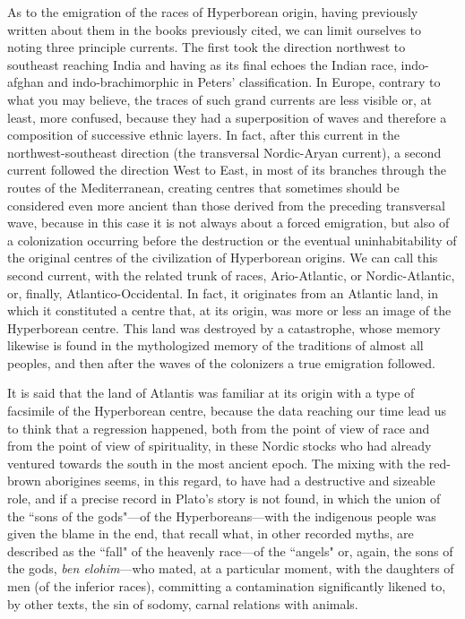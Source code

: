 As to the emigration of the races of Hyperborean origin, having previously written about them in the books previously cited, we can limit ourselves to noting three principle currents. The first took the direction northwest to southeast reaching India and having as its final echoes the Indian race, indo-afghan and indo-brachimorphic in Peters' classification. In Europe, contrary to what you may believe, the traces of such grand currents are less visible or, at least, more confused, because they had a superposition of waves and therefore a composition of successive ethnic layers. In fact, after this current in the northwest-southeast direction (the transversal Nordic-Aryan current), a second current followed the direction West to East, in most of its branches through the routes of the Mediterranean, creating centres that sometimes should be considered even more ancient than those derived from the preceding transversal wave, because in this case it is not always about a forced emigration, but also of a colonization occurring before the destruction or the eventual uninhabitability of the original centres of the civilization of Hyperborean origins. We can call this second current, with the related trunk of races, Ario-Atlantic, or Nordic-Atlantic, or, finally, Atlantico-Occidental. In fact, it originates from an Atlantic land, in which it constituted a centre that, at its origin, was more or less an image of the Hyperborean centre. This land was destroyed by a catastrophe, whose memory likewise is found in the mythologized memory of the traditions of almost all peoples, and then after the waves of the colonizers a true emigration followed.

It is said that the land of Atlantis was familiar at its origin with a type of facsimile of the Hyperborean centre, because the data reaching our time lead us to think that a regression happened, both from the point of view of race and from the point of view of spirituality, in these Nordic stocks who had already ventured towards the south in the most ancient epoch. The mixing with the red-brown aborigines seems, in this regard, to have had a destructive and sizeable role, and if a precise record in Plato's story is not found, in which the union of the ``sons of the gods"—of the Hyperboreans—with the indigenous people was given the blame in the end, that recall what, in other recorded myths, are described as the ``fall" of the heavenly race—of the ``angels" or, again, the sons of the gods, \emph{ben elohim}—who mated, at a particular moment, with the daughters of men (of the inferior races), committing a contamination significantly likened to, by other texts, the sin of sodomy, carnal relations with animals.


